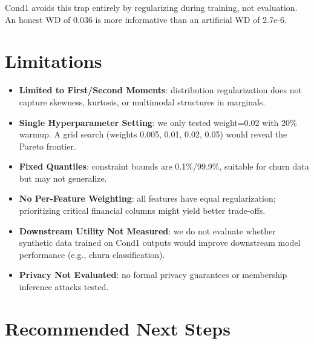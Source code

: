 \documentclass{article}
\begin{document}
Cond1 avoids this trap entirely by regularizing during training, not evaluation. An honest WD of 0.036 is more informative than an artificial WD of 2.7e-6.

\section{Limitations}

\begin{itemize}
  \item \textbf{Limited to First/Second Moments}: distribution regularization does not capture skewness, kurtosis, or multimodal structures in marginals.
  
  \item \textbf{Single Hyperparameter Setting}: we only tested weight=0.02 with 20\% warmup. A grid search (weights 0.005, 0.01, 0.02, 0.05) would reveal the Pareto frontier.
  
  \item \textbf{Fixed Quantiles}: constraint bounds are 0.1\%/99.9\%, suitable for churn data but may not generalize.
  
  \item \textbf{No Per-Feature Weighting}: all features have equal regularization; prioritizing critical financial columns might yield better trade-offs.
  
  \item \textbf{Downstream Utility Not Measured}: we do not evaluate whether synthetic data trained on Cond1 outputs would improve downstream model performance (e.g., churn classification).
  
  \item \textbf{Privacy Not Evaluated}: no formal privacy guarantees or membership inference attacks tested.
\end{itemize}

\section{Recommended Next Steps}
\end{document}
